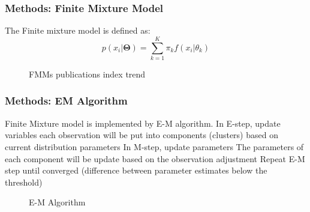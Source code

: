 \documentclass[xcolor=svgnames]{beamer}
\begin{document}

\begin{frame}\frametitle{Methods: Finite Mixture Model}

  The Finite mixture model is defined as:
\begin{equation}
p(x_i|\mathbf{\Theta}) = \sum_{k=1}^{K} \pi_k f(x_i|\theta_k)
\end{equation}

\begin{figure}
  \centering
  \caption{FMMs publications index trend~\cite{fmmtrend}}
\end{figure}

\end{frame}


\begin{frame}\frametitle{Methods: EM Algorithm}

  Finite Mixture model is implemented by E-M algorithm.
In E-step, update variables
each observation will be put into components (clusters) based on current distribution parameters
In M-step, update parameters
The parameters of each component will be update based on the observation adjustment
Repeat E-M step until converged (difference between parameter estimates below the threshold)


\begin{figure}
  \centering
  \caption{E-M Algorithm~\cite{phdthesis}}
\end{figure}

\end{frame}
\end{document}
